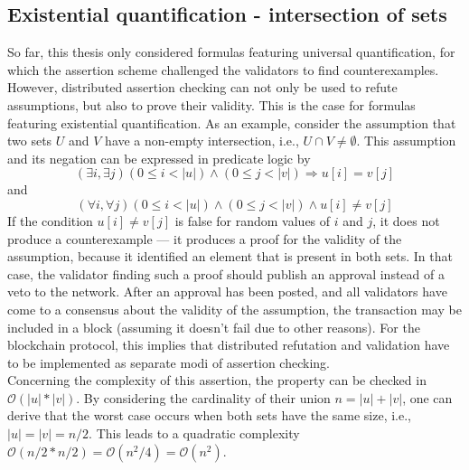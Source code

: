\subsection{Existential quantification - intersection of sets}\label{sec:existential}
So far, this thesis only considered formulas featuring universal quantification, for which the assertion scheme challenged the validators to find counterexamples. However, distributed assertion checking can not only be used to refute assumptions, but also to prove their validity. This is the case for formulas featuring existential quantification. As an example, consider the assumption that two sets $U$ and $V$ have a non-empty intersection, i.e., $U \cap V \neq \emptyset$. This assumption and its negation can be expressed in predicate logic by 
\begin{equation}\label{eq:intersect}
  (\exists i, \exists j) (0 \le i < |u|) \land (0 \le j < |v|) \Rightarrow u[i] = v[j]
\end{equation}
and
\begin{equation}\label{eq:intersect_neg}
  (\forall i, \forall j) (0 \le i < |u|) \land (0 \le j < |v|) \land u[i] \neq v[j]
\end{equation}
If the condition $u[i] \neq v[j]$ is false for random values of $i$ and $j$, it does not produce a counterexample --- it produces a proof for the validity of the assumption, because it identified an element that is present in both sets. In that case, the validator finding such a proof should publish an approval instead of a veto to the network. After an approval has been posted, and all validators have come to a consensus about the validity of the assumption, the transaction may be included in a block (assuming it doesn't fail due to other reasons). For the blockchain protocol, this implies that distributed refutation and validation have to be implemented as separate modi of assertion checking. \\

Concerning the complexity of this assertion, the property can be checked in $\mathcal{O}(|u|*|v|)$. By considering the cardinality of their union $n = |u|+|v|$, one can derive that the worst case occurs when both sets have the same size, i.e., $|u| = |v| = n/2$. This leads to a quadratic complexity $\mathcal{O}(n/2 * n/2) = \mathcal{O}(n^2/4) = \mathcal{O}(n^2)$.

